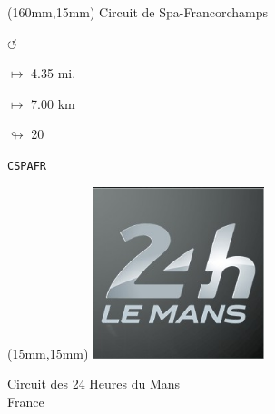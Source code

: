 \begin{textblock*}{40mm}(160mm,15mm)%
Circuit de Spa-Francorchamps
\par \Huge$\circlearrowleft$
\Large
\par$\mapsto$ 4.35 mi.
\par$\mapsto$ 7.00 km
\par$\looparrowright$ 20
\par\hfill\tiny\tt CSPAFR\\
\end{textblock*}
\null\newpage

\begin{textblock*}{50mm}(15mm,15mm)%
\includegraphics[width=50mm]{LG/2015-05-20_00084.png}
\par Circuit des 24 Heures du Mans\\ France
\end{textblock*}
